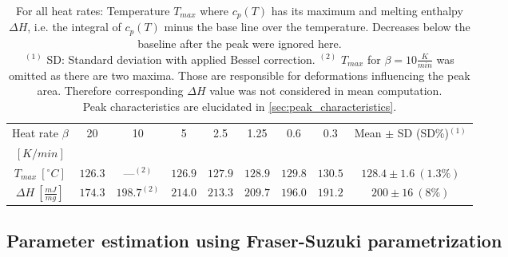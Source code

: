 \documentclass{scrartcl}[12pt, halfparskip]
\numberwithin{equation}{section}
\numberwithin{figure}{section}
\numberwithin{table}{section}
\begin{document}
\begin{table}[H]
	\centering
	\caption{For all heat rates: Temperature $T_{max}$ where $c_p(T)$ has its maximum and melting enthalpy $\Delta H$, i.e. the integral of $c_p(T)$ minus the base line over the temperature. Decreases below the baseline after the peak were ignored here. \\
		$^{(1)}$ SD: Standard deviation with applied Bessel correction. 
		$^{(2)}$ $T_{max}$ for $\beta=10\frac{K}{min}$ was omitted as there are two maxima. Those are responsible for deformations influencing the peak area. Therefore corresponding $\Delta H$ value was not considered in mean computation. \\
		Peak characteristics are elucidated in \cref{sec:peak_characteristics}.
	}
	\begin{tabular}{| c | c | c | c | c | c | c | c || c |} \hline
		Heat rate $\beta$ & 20 & 10 & 5 & 2.5 & 1.25 & 0.6 & 0.3 & Mean $\pm$ SD (SD\%)$^{(1)}$ \\
		$[K/min]$ & & & & & & & & \\ \hline
		$T_{max} \ [^{\circ}C]$ & $126.3$ & ---$^{(2)}$ & $126.9$ & $127.9$ & $128.9$ & $129.8$ & $130.5$ & $128.4 \pm 1.6 \ (1.3\%)$ \\[0.7ex]
		$\Delta H \ [\frac{mJ}{mg}]$ & $174.3$ & $198.7^{(2)}$ & $214.0$ & $213.3$ & $209.7$ & $196.0$ & $191.2$ & $200 \pm 16 \ (8\%)$ \\ \hline
	\end{tabular}
	\label{tab:eval_table_Tmax_deltaH_5Gaussians}
\end{table}


\subsection{Parameter estimation using Fraser-Suzuki parametrization}
\label{sec:param_estimation_fs}
\end{document}
